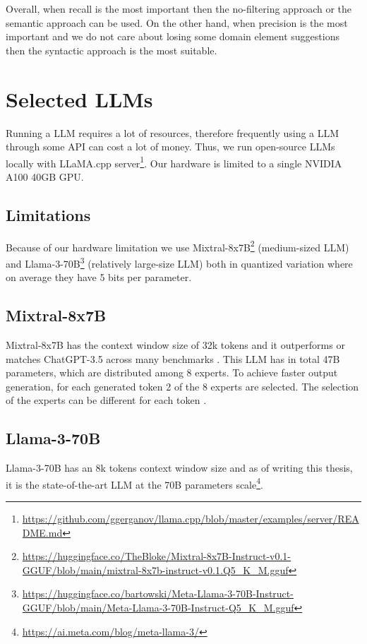 Overall, when recall is the most important then the no-filtering approach or the semantic approach can be used. On the other hand, when precision is the most important and we do not care about losing some domain element suggestions then the syntactic approach is the most suitable.


\section{Selected LLMs}

Running a LLM requires a lot of resources, therefore frequently using a LLM through some API can cost a lot of money. Thus, we run open-source LLMs locally with LLaMA.cpp server\footnote{\url{https://github.com/ggerganov/llama.cpp/blob/master/examples/server/README.md}}. Our hardware is limited to a single NVIDIA A100 40GB GPU.

\subsection{Limitations}

Because of our hardware limitation we use Mixtral-8x7B\footnote{\url{https://huggingface.co/TheBloke/Mixtral-8x7B-Instruct-v0.1-GGUF/blob/main/mixtral-8x7b-instruct-v0.1.Q5_K_M.gguf}} (medium-sized LLM) \cite{Jiang2024} and Llama-3-70B\footnote{\url{https://huggingface.co/bartowski/Meta-Llama-3-70B-Instruct-GGUF/blob/main/Meta-Llama-3-70B-Instruct-Q5_K_M.gguf}} (relatively large-size LLM) both in quantized variation where on average they have 5 bits per parameter.


\subsection{Mixtral-8x7B}

Mixtral-8x7B has the context window size of 32k tokens and it outperforms or matches ChatGPT-3.5 across many benchmarks \cite{Jiang2024}. This LLM has in total 47B parameters, which are distributed among 8 experts. To achieve faster output generation, for each generated token 2 of the 8 experts are selected. The selection of the experts can be different for each token \cite{Jiang2024}.


\subsection{Llama-3-70B}

Llama-3-70B has an 8k tokens context window size and as of writing this thesis, it is the state-of-the-art LLM at the 70B parameters scale\footnote{\url{https://ai.meta.com/blog/meta-llama-3/}}.


